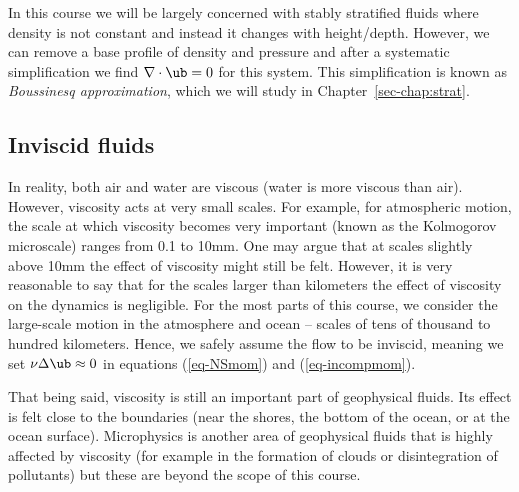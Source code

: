 \documentclass[
  letterpaper,
  twocolumn,
  landscape]{report}
\begin{document}
\begin{tcolorbox}[enhanced jigsaw, toprule=.15mm, left=2mm, opacityback=0, breakable, arc=.35mm, colback=white, rightrule=.15mm, bottomrule=.15mm, colframe=quarto-callout-note-color-frame, leftrule=.75mm]
\begin{minipage}[t]{5.5mm}
\textcolor{quarto-callout-note-color}{\faInfo}
\end{minipage}%
\begin{minipage}[t]{\textwidth - 5.5mm}

In this course we will be largely concerned with stably stratified
fluids where density is not constant and instead it changes with
height/depth. However, we can remove a base profile of density and
pressure and after a systematic simplification we find
\(\nabla\cdot\ub = 0\) for this system. This simplification is known as
\emph{Boussinesq approximation}, which we will study in
Chapter~\ref{sec-chap:strat}.

\end{minipage}%
\end{tcolorbox}

\hypertarget{inviscid-fluids}{%
\subsection{Inviscid fluids}\label{inviscid-fluids}}

In reality, both air and water are viscous (water is more viscous than
air). However, viscosity acts at very small scales. For example, for
atmospheric motion, the scale at which viscosity becomes very important
(known as the Kolmogorov microscale) ranges from 0.1 to
10\(\mathrm{mm}\). One may argue that at scales slightly above
10\(\mathrm{mm}\) the effect of viscosity might still be felt. However,
it is very reasonable to say that for the scales larger than kilometers
the effect of viscosity on the dynamics is negligible. For the most
parts of this course, we consider the large-scale motion in the
atmosphere and ocean -- scales of tens of thousand to hundred
kilometers. Hence, we safely assume the flow to be inviscid, meaning we
set \(\nu\Delta\ub \approx 0\) in equations (\ref{eq-NSmom}) and
(\ref{eq-incompmom}).

That being said, viscosity is still an important part of geophysical
fluids. Its effect is felt close to the boundaries (near the shores, the
bottom of the ocean, or at the ocean surface). Microphysics is another
area of geophysical fluids that is highly affected by viscosity (for
example in the formation of clouds or disintegration of pollutants) but
these are beyond the scope of this course.
\end{document}
